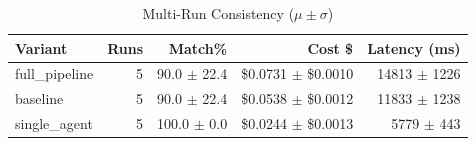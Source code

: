 \begin{table}[htbp]
\centering
\caption{Multi-Run Consistency ($\mu \pm \sigma$)}
\label{tab:consistency}
\begin{tabular}{l r rrr}
\toprule
Variant & Runs & Match\% & Cost \$ & Latency (ms) \\
\midrule
  full\_pipeline & 5 & 90.0 $\pm$ 22.4 & \$0.0731 $\pm$ \$0.0010 & 14813 $\pm$ 1226 \\
  baseline & 5 & 90.0 $\pm$ 22.4 & \$0.0538 $\pm$ \$0.0012 & 11833 $\pm$ 1238 \\
  single\_agent & 5 & 100.0 $\pm$ 0.0 & \$0.0244 $\pm$ \$0.0013 & 5779 $\pm$ 443 \\
\bottomrule
\end{tabular}
\end{table}
